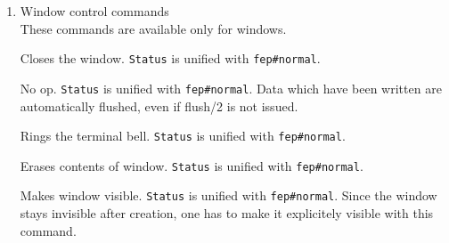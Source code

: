 \begin{enumerate}
These commands are available for window and file devices opened in write or
append more.
\begin{itemize}

Writes the character corresponding to \verb|Char| (integer)
according to the ASCII code.
\verb|Status| is unified with \verb|fep#normal|.

\Caution Not available on Multi-PSI V2 FEP.

Writes string \verb|Line| (8 bits string) and adds a newline character.
\verb|Status| is unified with \verb|fep#normal|.

\Caution Not available on Multi-PSI V2 FEP.

Writes string in Buffer (8 bits string).  \verb|Status| is
unified with \verb|fep#normal|.

Writes the term specified by \verb|Term|, whith maximum length \verb|Length|
and maximum depth \verb|Depth|. The part of term which exceeds Length or Depth
is printed as `\verb|...|'. \verb|Status| is unified with \verb|fep#normal|.
Since this command uses output function for debugging, variables in \verb|Term|
are written like A, B, C with a symbol MRB or HOOK.

\Caution Not available on Multi-PSI V2 FEP.

\end{itemize}
\item Window control commands\\

These commands are available only for windows.
\begin{itemize}

Closes the window. \verb|Status| is unified with \verb|fep#normal|.

No op. \verb|Status| is unified with \verb|fep#normal|. Data
which have been written are automatically flushed, even if flush/2
is not issued.

Rings the terminal bell. \verb|Status| is unified with \verb|fep#normal|.

Erases contents of window. \verb|Status| is unified with
\verb|fep#normal|.

Makes window visible. \verb|Status| is unified with \verb|fep#normal|.
Since the window stays invisible after creation, one has to
make it explicitely visible with this command.


\end{itemize}
\end{enumerate}
